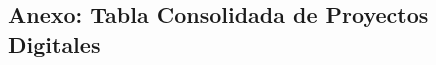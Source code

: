 \documentclass[9pt,letterpaper,twocolumn,twoside,apabib]{rho-class/rho}
\begin{document}
\appendix
\clearpage
\begin{landscape}
  \section{Anexo: Tabla Consolidada de Proyectos Digitales}
  
\end{landscape}
\clearpage
\end{document}
